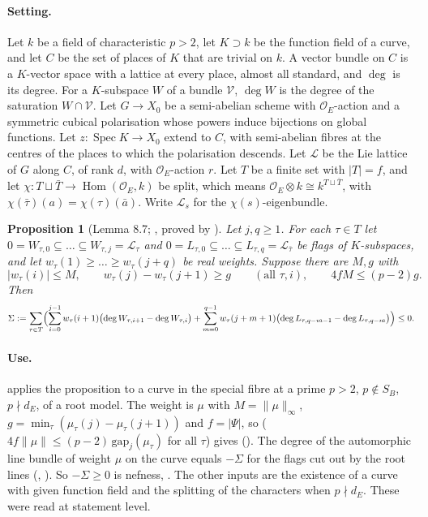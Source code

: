 \documentclass[11pt]{article}
\newtheorem{proposition}[theorem]{Proposition}
\theoremstyle{remark}
\begin{document}
\paragraph{Setting.} Let $k$ be a field of characteristic $p>2$, let $K\supset k$ be the function field of a curve, and let $C$ be the set of places of $K$ that are trivial on $k$. A vector bundle on $C$ is a $K$-vector space with a lattice at every place, almost all standard, and $\deg$ is its degree. For a $K$-subspace $W$ of a bundle $\mathcal V$, $\deg W$ is the degree of the saturation $W\cap\mathcal V$. Let $G\to X_0$ be a semi-abelian scheme with $\mathcal O_E$-action and a symmetric cubical polarisation whose powers induce bijections on global functions. Let $z:\operatorname{Spec}K\to X_0$ extend to $C$, with semi-abelian fibres at the centres of the places to which the polarisation descends. Let $\mathcal L$ be the Lie lattice of $G$ along $C$, of rank $d$, with $\mathcal O_E$-action $r$. Let $T$ be a finite set with $\lvert T\rvert=f$, and let $\chi:T\sqcup\bar T\to\operatorname{Hom}(\mathcal O_E,k)$ be split, which means $\mathcal O_E\otimes k\cong k^{T\sqcup\bar T}$, with $\chi(\bar\tau)(a)=\chi(\tau)(\bar a)$. Write $\mathcal L_s$ for the $\chi(s)$-eigenbundle.

\begin{proposition}[Lemma 8.7; , proved by ]\label{prop:l87}
Let $j,q\ge1$. For each $\tau\in T$ let $0=W_{\tau,0}\subseteq\dots\subseteq W_{\tau,j}=\mathcal L_\tau$ and $0=L_{\tau,0}\subseteq\dots\subseteq L_{\tau,q}=\mathcal L_{\bar\tau}$ be flags of $K$-subspaces, and let $w_\tau(1)\ge\dots\ge w_\tau(j+q)$ be real weights. Suppose there are $M,g$ with
\[
\lvert w_\tau(i)\rvert\le M,\qquad w_\tau(j)-w_\tau(j+1)\ge g\qquad(\text{all }\tau,i),\qquad 4fM\le(p-2)g .
\]
Then
\[
\Sigma:=\sum_{\tau\in T}\Bigl(\sum_{i=0}^{j-1}w_\tau(i+1)\bigl(\deg W_{\tau,i+1}-\deg W_{\tau,i}\bigr)+\sum_{m=0}^{q-1}w_\tau(j+m+1)\bigl(\deg L_{\tau,q-m-1}-\deg L_{\tau,q-m}\bigr)\Bigr)\le0 .
\]
\end{proposition}

\paragraph{Use.}  applies the proposition to a curve in the special fibre at a prime $p>2$, $p\notin S_B$, $p\nmid d_E$, of a root model. The weight is $\mu$ with $M=\lVert\mu\rVert_\infty$, $g=\min_\tau(\mu_\tau(j)-\mu_\tau(j+1))$ and $f=\lvert\Psi\rvert$, so  ($4f\lVert\mu\rVert\le(p-2)\,\mathrm{gap}_j(\mu_\tau)$ for all $\tau$) gives  (). The degree of the automorphic line bundle of weight $\mu$ on the curve equals $-\Sigma$ for the flags cut out by the root lines (, ). So $-\Sigma\ge0$ is nefness, . The other inputs are the existence of a curve with given function field and the splitting of the characters when $p\nmid d_E$. These were read at statement level.
\end{document}
